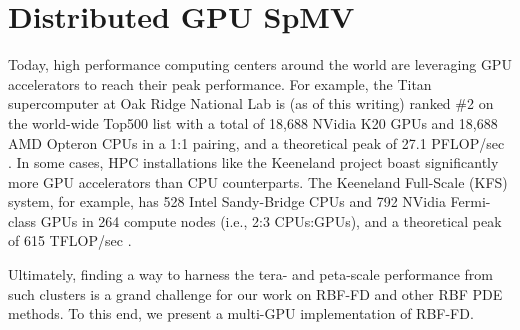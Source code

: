 

\chapter{Distributed GPU SpMV}
\label{chap:multigpu_rbffd}





Today, high performance computing centers around the world are leveraging GPU accelerators to reach their peak performance. For example, the Titan supercomputer at Oak Ridge National Lab is (as of this writing) ranked \#2 on the world-wide Top500 list with a total of 18,688 NVidia K20 GPUs and 18,688 AMD Opteron CPUs in a 1:1 pairing, and a theoretical peak of 27.1 PFLOP/sec \cite{TitanGPUCluster}. 
In some cases, HPC installations like the Keeneland project \cite{Vetter2011} boast significantly more GPU accelerators than CPU counterparts. The Keeneland Full-Scale (KFS) system, for example, has 528 Intel Sandy-Bridge CPUs and 792 NVidia Fermi-class GPUs in 264 compute nodes (i.e., 2:3 CPUs:GPUs), and a theoretical peak of 615 TFLOP/sec \cite{Vetter2011}. 

Ultimately, finding a way to harness the tera- and peta-scale performance from such clusters is a grand challenge for our work on RBF-FD and other RBF PDE methods. To this end, we present a multi-GPU implementation of RBF-FD.

